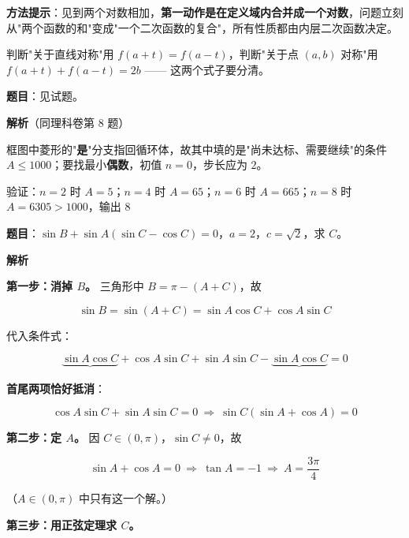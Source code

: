 
\begin{gktip}
\textbf{方法提示}：见到两个对数相加，\textbf{第一动作是在定义域内合并成一个对数}，问题立刻从"两个函数的和"变成"一个二次函数的复合"，所有性质都由内层二次函数决定。

判断"关于直线对称"用 $f(a+t)=f(a-t)$，判断"关于点 $(a,b)$ 对称"用 $f(a+t)+f(a-t)=2b$ —— 这两个式子要分清。
\end{gktip}

\par\medskip


\textbf{题目}：见试题。

\begin{center}\end{center}

\textbf{解析}（同理科卷第 8 题）

框图中菱形的"\textbf{是}"分支指回循环体，故其中填的是"尚未达标、需要继续"的条件 $A\le1000$；要找最小\textbf{偶数}，初值 $n=0$，步长应为 $2$。

验证：$n=2$ 时 $A=5$；$n=4$ 时 $A=65$；$n=6$ 时 $A=665$；$n=8$ 时 $A=6305>1000$，输出 $8$ 


\par\medskip


\textbf{题目}：$\sin B+\sin A(\sin C-\cos C)=0$，$a=2$，$c=\sqrt2$，求 $C$。

\textbf{解析}

\textbf{第一步：消掉 $B$。} 三角形中 $B=\pi-(A+C)$，故

\[\sin B=\sin(A+C)=\sin A\cos C+\cos A\sin C\]

代入条件式：

\[\underbrace{\sin A\cos C}_{}+\cos A\sin C+\sin A\sin C-\underbrace{\sin A\cos C}_{}=0\]

\textbf{首尾两项恰好抵消}：

\[\cos A\sin C+\sin A\sin C=0\ \Longrightarrow\ \sin C\left(\sin A+\cos A\right)=0\]

\textbf{第二步：定 $A$。} 因 $C\in(0,\pi)$，$\sin C\ne0$，故

\[\sin A+\cos A=0\ \Longrightarrow\ \tan A=-1\ \Longrightarrow\ A=\frac{3\pi}4\]

（$A\in(0,\pi)$ 中只有这一个解。）

\textbf{第三步：用正弦定理求 $C$。}

